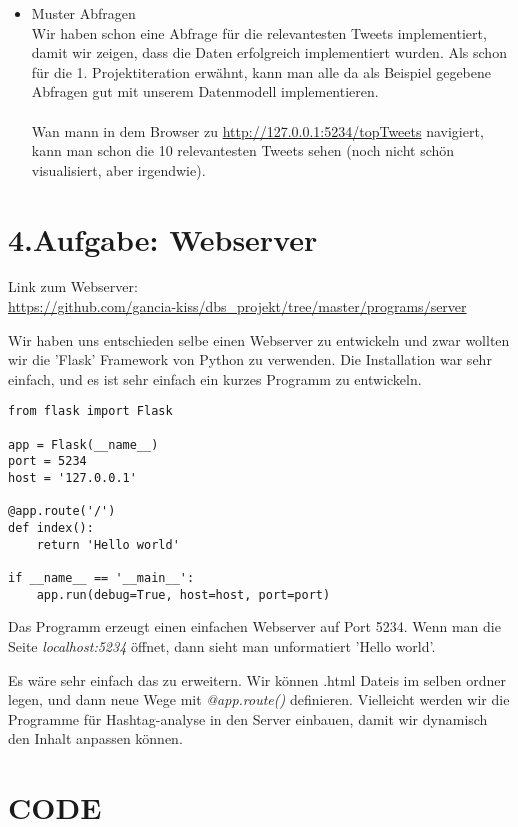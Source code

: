 \begin{itemize}
\item Muster Abfragen \\

Wir haben schon eine Abfrage für die relevantesten Tweets implementiert, damit wir zeigen, dass die Daten erfolgreich implementiert wurden. Als schon für die 1. Projektiteration erwähnt, kann man alle da als Beispiel gegebene Abfragen gut mit unserem Datenmodell implementieren. \\ \\

Wan mann in dem Browser zu \url{http://127.0.0.1:5234/topTweets} navigiert, kann man schon die 10 relevantesten Tweets sehen (noch nicht schön visualisiert, aber irgendwie). \\

\end{itemize}

\section*{4.Aufgabe: Webserver}
Link zum Webserver: \\
\url{https://github.com/gancia-kiss/dbs_projekt/tree/master/programs/server}

Wir haben uns entschieden selbe einen Webserver zu entwickeln und zwar wollten wir die 'Flask' Framework von Python zu verwenden. Die Installation war sehr einfach, und es ist sehr einfach ein kurzes Programm zu entwickeln.

\begin{lstlisting}[style=py]
from flask import Flask

app = Flask(__name__)
port = 5234
host = '127.0.0.1'

@app.route('/')
def index():
    return 'Hello world'

if __name__ == '__main__':
    app.run(debug=True, host=host, port=port)
\end{lstlisting}
Das Programm erzeugt einen einfachen Webserver auf Port 5234. Wenn man die Seite 
\textit{localhost:5234} öffnet, dann sieht man unformatiert 'Hello world'.

Es wäre sehr einfach das zu erweitern. Wir können .html Dateis im selben ordner legen, und dann neue Wege mit \textit{@app.route()} definieren. Vielleicht werden wir die Programme für Hashtag-analyse in den Server einbauen, damit wir dynamisch den Inhalt anpassen können.


\section*{CODE}

